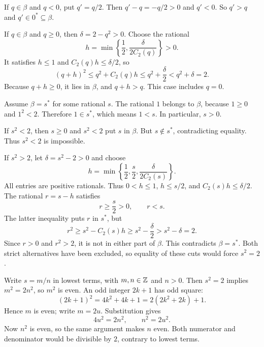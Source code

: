 If $q\in\beta$ and $q<0$, put $q'=q/2$.
Then $q'-q=-q/2>0$ and $q'<0$.
So $q'>q$ and $q'\in0^*\subseteq\beta$.

If $q\in\beta$ and $q\ge0$, then $\delta=2-q^2>0$.
Choose the rational
\[
 h=\min\left\{\frac12,\frac{\delta}{2C_2(q)}\right\}>0.
\]
It satisfies $h\le1$ and $C_2(q)h\le\delta/2$, so
\[
 (q+h)^2\le q^2+C_2(q)h
          \le q^2+\frac\delta2
          <q^2+\delta=2.
\]
Because $q+h\ge0$, it lies in $\beta$, and $q+h>q$.
This case includes $q=0$.


Assume $\beta=s^*$ for some rational $s$.
The rational $1$ belongs to $\beta$, because $1\ge0$ and $1^2<2$.
Therefore $1\in s^*$, which means $1<s$. In particular, $s>0$.

If $s^2<2$, then $s\ge0$ and $s^2<2$ put $s$ in $\beta$.
But $s\notin s^*$, contradicting equality. Thus $s^2<2$ is impossible.

If $s^2>2$, let $\delta=s^2-2>0$ and choose
\[
 h=\min\left\{\frac12,\frac s2,
                      \frac{\delta}{2C_2(s)}\right\}.
\]
All entries are positive rationals. Thus $0<h\le1$, $h\le s/2$,
and $C_2(s)h\le\delta/2$. The rational $r=s-h$ satisfies
\[
 r\ge\frac s2>0,\qquad r<s.
\]
The latter inequality puts $r$ in $s^*$, but
\[
 r^2\ge s^2-C_2(s)h
      \ge s^2-\frac\delta2
      >s^2-\delta=2.
\]
Since $r>0$ and $r^2>2$, it is not in either part of $\beta$.
This contradicts $\beta=s^*$. Both strict alternatives have been
excluded, so equality of these cuts would force $s^2=2$.

Write $s=m/n$ in lowest terms, with $m,n\in\mathbb{Z}$ and $n>0$.
Then $s^2=2$ implies $m^2=2n^2$, so $m^2$ is even.
An odd integer $2k+1$ has odd square:
\[
 (2k+1)^2=4k^2+4k+1=2(2k^2+2k)+1.
\]
Hence $m$ is even; write $m=2u$. Substitution gives
\[
 4u^2=2n^2,\qquad n^2=2u^2.
\]
Now $n^2$ is even, so the same argument makes $n$ even.
Both numerator and denominator would be divisible by $2$,
contrary to lowest terms.

